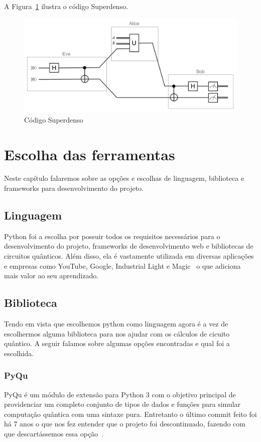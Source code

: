 \documentclass[a4paper, 12pt, oneside]{book}
\begin{document}
A Figura~\ref{fig:superdense} ilustra o código Superdenso.
\begin{figure}[H]
\centering
\includegraphics[scale=0.38]{superdenso.jpg}
\caption{Código Superdenso}
\label{fig:superdense}
\end{figure}


\chapter{Escolha das ferramentas}
\thispagestyle{empty} 


Neste capítulo falaremos sobre as opções e escolhas de linguagem, biblioteca e frameworks para desenvolvimento do projeto. 

\section{Linguagem}

Python foi a escolha por possuir todos os requisitos necessários para o desenvolvimento do projeto, frameworks de desenvolvimento web e bibliotecas de circuitos quânticos. Além disso, ela é vastamente utilizada em diversas aplicações e empresas como YouTube, Google, Industrial Light e Magic~\cite{pythonquotes} o que adiciona mais valor ao seu aprendizado.

\section{Biblioteca}

Tendo em vista que escolhemos python como linguagem agora é a vez de escolhermos alguma biblioteca para nos ajudar com os cálculos de cicuito quântico. A seguir falamos sobre algumas opções encontradas e qual foi a escolhida.
\subsection{PyQu}
PyQu é um módulo de extensão para Python 3 com o objetivo principal de providenciar um completo conjunto de tipos de dados e funções para simular computação quântica com uma sintaxe pura. Entretanto o último commit feito foi há 7 anos o que nos fez entender que o projeto foi descontinuado, fazendo com que descartássemos essa opção~\cite{pyqu}.
\end{document}
